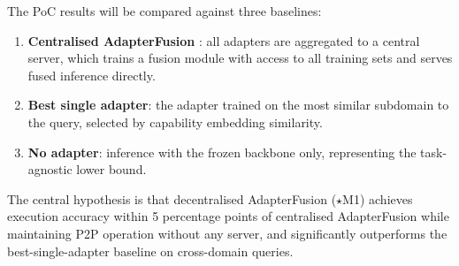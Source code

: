 The PoC results will be compared against three baselines:
\begin{enumerate}
  \item \textbf{Centralised AdapterFusion} \citep{Pfeiffer2021fusion}: all adapters
    are aggregated to a central server, which trains a fusion module with access to
    all training sets and serves fused inference directly.
  \item \textbf{Best single adapter}: the adapter trained on the most similar subdomain
    to the query, selected by capability embedding similarity.
  \item \textbf{No adapter}: inference with the frozen backbone only, representing
    the task-agnostic lower bound.
\end{enumerate}

The central hypothesis is that decentralised AdapterFusion ($\star$M1) achieves
execution accuracy within 5 percentage points of centralised AdapterFusion while
maintaining P2P operation without any server, and significantly outperforms the
best-single-adapter baseline on cross-domain queries.
